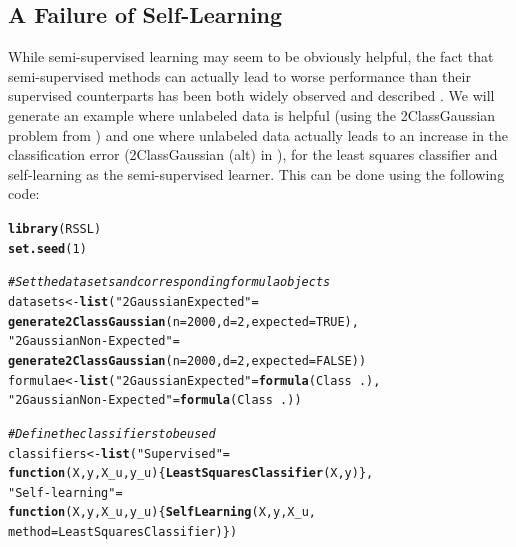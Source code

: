 \documentclass[runningheads,a4paper]{llncs}\usepackage[]{graphicx}\usepackage[]{color}
\makeatletter
\newcommand{\hlnum}[1]{\textcolor[rgb]{0.686,0.059,0.569}{#1}}%
\newcommand{\hlstr}[1]{\textcolor[rgb]{0.192,0.494,0.8}{#1}}%
\newcommand{\hlcom}[1]{\textcolor[rgb]{0.678,0.584,0.686}{\textit{#1}}}%
\newcommand{\hlopt}[1]{\textcolor[rgb]{0,0,0}{#1}}%
\newcommand{\hlstd}[1]{\textcolor[rgb]{0.345,0.345,0.345}{#1}}%
\newcommand{\hlkwa}[1]{\textcolor[rgb]{0.161,0.373,0.58}{\textbf{#1}}}%
\newcommand{\hlkwb}[1]{\textcolor[rgb]{0.69,0.353,0.396}{#1}}%
\newcommand{\hlkwc}[1]{\textcolor[rgb]{0.333,0.667,0.333}{#1}}%
\newcommand{\hlkwd}[1]{\textcolor[rgb]{0.737,0.353,0.396}{\textbf{#1}}}%
\newenvironment{kframe}{%
 \def\at@end@of@kframe{}%
 \ifinner\ifhmode%
  \def\at@end@of@kframe{\end{minipage}}%
  \begin{minipage}{\columnwidth}%
 \fi\fi%
 \def\FrameCommand##1{\hskip\@totalleftmargin \hskip-\fboxsep
 \colorbox{shadecolor}{##1}\hskip-\fboxsep
     \hskip-\linewidth \hskip-\@totalleftmargin \hskip\columnwidth}%
 \MakeFramed {\advance\hsize-\width
   \@totalleftmargin\z@ \linewidth\hsize
   \@setminipage}}%
 {\par\unskip\endMakeFramed%
 \at@end@of@kframe}
\newenvironment{knitrout}{}{} %
\makeatother
\begin{document}
\subsection{A Failure of Self-Learning}
While semi-supervised learning may seem to be obviously helpful, the fact that semi-supervised methods can actually lead to worse performance than their supervised counterparts has been both widely observed and described \cite{Cozman2003}. We will generate an example where unlabeled data is helpful (using the 2ClassGaussian problem from ) and one where unlabeled data actually leads to an increase in the classification error (2ClassGaussian (alt) in ), for the least squares classifier and self-learning as the semi-supervised learner. This can be done using the following code:
\begin{knitrout}\footnotesize
{}\color{fgcolor}\begin{kframe}
\begin{alltt}
\hlkwd{library}\hlstd{(RSSL)}
\hlkwd{set.seed}\hlstd{(}\hlnum{1}\hlstd{)}

\hlcom{# Set the datasets and corresponding formula objects}
\hlstd{datasets} \hlkwb{<-} \hlkwd{list}\hlstd{(}\hlstr{"2 Gaussian Expected"}\hlstd{=}
                   \hlkwd{generate2ClassGaussian}\hlstd{(}\hlkwc{n}\hlstd{=}\hlnum{2000}\hlstd{,}\hlkwc{d}\hlstd{=}\hlnum{2}\hlstd{,}\hlkwc{expected}\hlstd{=}\hlnum{TRUE}\hlstd{),}
                 \hlstr{"2 Gaussian Non-Expected"}\hlstd{=}
                   \hlkwd{generate2ClassGaussian}\hlstd{(}\hlkwc{n}\hlstd{=}\hlnum{2000}\hlstd{,}\hlkwc{d}\hlstd{=}\hlnum{2}\hlstd{,}\hlkwc{expected}\hlstd{=}\hlnum{FALSE}\hlstd{))}
\hlstd{formulae} \hlkwb{<-} \hlkwd{list}\hlstd{(}\hlstr{"2 Gaussian Expected"}\hlstd{=}\hlkwd{formula}\hlstd{(Class}\hlopt{~}\hlstd{.),}
                 \hlstr{"2 Gaussian Non-Expected"}\hlstd{=}\hlkwd{formula}\hlstd{(Class}\hlopt{~}\hlstd{.))}

\hlcom{# Define the classifiers to be used}
\hlstd{classifiers} \hlkwb{<-} \hlkwd{list}\hlstd{(}\hlstr{"Supervised"} \hlstd{=}
                      \hlkwa{function}\hlstd{(}\hlkwc{X}\hlstd{,}\hlkwc{y}\hlstd{,}\hlkwc{X_u}\hlstd{,}\hlkwc{y_u}\hlstd{) \{} \hlkwd{LeastSquaresClassifier}\hlstd{(X,y)\},}
                    \hlstr{"Self-learning"} \hlstd{=}
                      \hlkwa{function}\hlstd{(}\hlkwc{X}\hlstd{,}\hlkwc{y}\hlstd{,}\hlkwc{X_u}\hlstd{,}\hlkwc{y_u}\hlstd{) \{} \hlkwd{SelfLearning}\hlstd{(X,y,X_u,}
                                                \hlkwc{method} \hlstd{= LeastSquaresClassifier)\})}


\end{alltt}
\end{kframe}
\end{knitrout}
\end{document}
